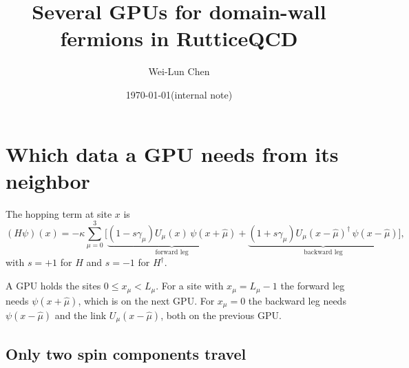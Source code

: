\documentclass[11pt,a4paper]{article}
\title{Several GPUs for domain-wall fermions in RutticeQCD}
\author{Wei-Lun Chen}
\date{\today\quad(internal note)}
\numberwithin{equation}{section}
\newcommand{\dg}{^{\dagger}}
\begin{document}
\maketitle
\tableofcontents

\section{Which data a GPU needs from its neighbor}

The hopping term at site $x$ is
\begin{equation}
(H\psi)(x) = -\kappa\sum_{\mu=0}^{3}\Big[
\underbrace{(1-s\gamma_\mu)U_\mu(x)\,\psi(x+\hat\mu)}_{\text{forward leg}}
+\underbrace{(1+s\gamma_\mu)U_\mu(x-\hat\mu)\dg\,\psi(x-\hat\mu)}_{\text{backward leg}}\Big],
\end{equation}
with $s=+1$ for $H$ and $s=-1$ for $H\dg$.

A GPU holds the sites $0\le x_\mu<L_\mu$. For a site with $x_\mu=L_\mu-1$ the forward leg needs
$\psi(x+\hat\mu)$, which is on the next GPU. For $x_\mu=0$ the backward leg needs
$\psi(x-\hat\mu)$ and the link $U_\mu(x-\hat\mu)$, both on the previous GPU.

\subsection{Only two spin components travel}
\end{document}
